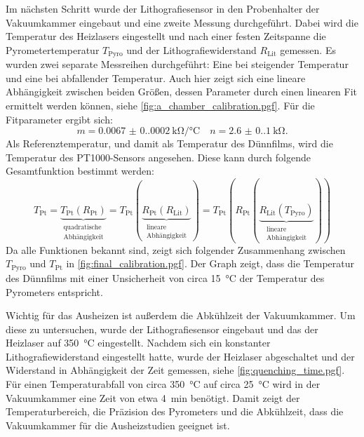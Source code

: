 Im nächsten Schritt wurde der Lithografiesensor in den Probenhalter der Vakuumkammer eingebaut und eine
zweite Messung durchgeführt.
Dabei wird die Temperatur des Heizlasers eingestellt und nach einer festen Zeitspanne die Pyrometertemperatur
$T_\mathrm{Pyro}$ und der Lithografiewiderstand $R_\mathrm{Lit}$ gemessen.
Es wurden zwei separate Messreihen durchgeführt: Eine bei steigender Temperatur und eine bei abfallender Temperatur.
Auch hier zeigt sich eine lineare Abhängigkeit zwischen beiden Größen, dessen Parameter durch einen linearen Fit
ermittelt werden können, siehe \cref{fig:a_chamber_calibration.pgf}.
Für die Fitparameter ergibt sich:
\begin{equation*}
    m = \qty{0.0067(0.0002)}{\kilo\ohm\per\degreeCelsius} \quad n = \qty{2.6(0.1)}{\kilo\ohm}.
\end{equation*}
Als Referenztemperatur, und damit als Temperatur des Dünnfilms, wird die Temperatur des PT1000-Sensors angesehen.
Diese kann durch folgende Gesamtfunktion bestimmt werden:
\begin{equation}
    T_{\mathrm{Pt}}=\underbrace{ T_{\mathrm{Pt}}(R_{\mathrm{Pt}}) }_{
        \substack{\text{quadratische} \\ \text{Abhängigkeit}}}
    =T_{\mathrm{Pt}}(\underbrace{ R_{\mathrm{Pt}}(R_{\mathrm{Lit}}) }_{
        \substack{\text{lineare} \\ \text{Abhängigkeit}}  })
    =T_{\mathrm{Pt}}(R_{\mathrm{Pt}}(\underbrace{ R_{\mathrm{Lit}}(T_{\mathrm{Pyro}}) }_{
        \substack{\text{lineare} \\ \text{Abhängigkeit}}  }))
    \label{eq:temperature_calibration}
\end{equation}
Da alle Funktionen bekannt sind, zeigt sich folgender Zusammenhang zwischen $T_{\mathrm{Pyro}}$ und $T_{\mathrm{Pt}}$
in \cref{fig:final_calibration.pgf}.
Der Graph zeigt, dass die Temperatur des Dünnfilms mit einer Unsicherheit von circa \qty{15}{\degreeCelsius}
der Temperatur des Pyrometers entspricht.

Wichtig für das Ausheizen ist außerdem die Abkühlzeit der Vakuumkammer.
Um diese zu untersuchen, wurde der Lithografiesensor eingebaut und das der Heizlaser auf \qty{350}{\degreeCelsius}
eingestellt.
Nachdem sich ein konstanter Lithografiewiderstand eingestellt hatte, wurde der Heizlaser abgeschaltet und der
Widerstand in Abhängigkeit der Zeit gemessen, siehe \cref{fig:quenching_time.pgf}.
Für einen Temperaturabfall von circa \qty{350}{\degreeCelsius} auf circa \qty{25}{\degreeCelsius}
wird in der Vakuumkammer eine Zeit von etwa \qty{4}{\minute} benötigt.
Damit zeigt der Temperaturbereich, die Präzision des Pyrometers und die Abkühlzeit, dass
die Vakuumkammer für die Ausheizstudien geeignet ist.


